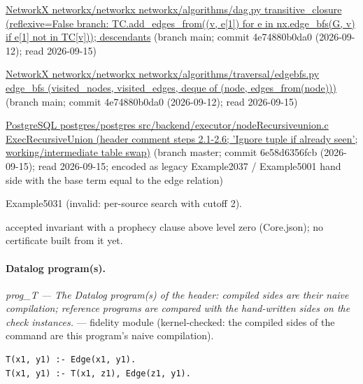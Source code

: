 \documentclass[10pt]{article}
\begin{document}
\begin{description}[leftmargin=2.6cm,style=nextline,itemsep=1pt]
\item[Sources] {\raggedright \href{https://github.com/networkx/networkx/blob/main/networkx/algorithms/dag.py}{NetworkX networkx/networkx networkx/algorithms/dag.py transitive\_closure (reflexive=False branch: TC.add\_edges\_from((v, e[1]) for e in nx.edge\_bfs(G, v) if e[1] not in TC[v])); descendants} (branch main; commit 4e74880b0da0 (2026-09-12); read 2026-09-15) \par \href{https://github.com/networkx/networkx/blob/main/networkx/algorithms/traversal/edgebfs.py}{NetworkX networkx/networkx networkx/algorithms/traversal/edgebfs.py edge\_bfs (visited\_nodes, visited\_edges, deque of (node, edges\_from(node)))} (branch main; commit 4e74880b0da0 (2026-09-12); read 2026-09-15) \par \href{https://github.com/postgres/postgres/blob/master/src/backend/executor/nodeRecursiveunion.c}{PostgreSQL postgres/postgres src/backend/executor/nodeRecursiveunion.c ExecRecursiveUnion (header comment steps 2.1-2.6; 'Ignore tuple if already seen'; working/intermediate table swap)} (branch master; commit 6e58d6356fcb (2026-09-15); read 2026-09-15; encoded as legacy Example2037 / Example5001 hand side with the base term equal to the edge relation)\par}

\item[Twin] Example5031 (invalid: per-source search with cutoff 2).

\item[Prophecy] accepted invariant with a prophecy clause above level zero (Core.json); no certificate built from it yet.

\end{description}

\paragraph{Datalog program(s).}

{\raggedright\textit{prog\_T --- The Datalog program(s) of the header: compiled sides are their naive compilation; reference programs are compared with the hand-written sides on the check instances.} --- fidelity module (kernel-checked: the compiled sides of the command are this program's naive compilation).\par}

\begin{Verbatim}[fontsize=\scriptsize,breaklines=true,breakanywhere=true,frame=single,framesep=1.5mm]
T(x1, y1) :- Edge(x1, y1).
T(x1, y1) :- T(x1, z1), Edge(z1, y1).
\end{Verbatim}
\end{document}
